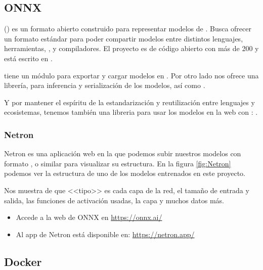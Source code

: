 \subsection{ONNX}\label{tool:ONNX}

 () es un formato abierto construido para representar modelos de . Busca ofrecer un formato estándar para poder compartir modelos entre distintos lenguajes, herramientas, ,  y compiladores. El proyecto es de código abierto con más de 200  y está escrito en .



 tiene un módulo para exportar y cargar modelos en . Por otro lado  nos ofrece una librería,  para inferencia y serialización de los modelos, así como .

Y por mantener el espíritu de la estandarización y reutilización entre lenguajes y ecosistemas, tenemos también una libreria para usar los modelos en la web con : .

\subsubsection{Netron}

Netron es una aplicación web en la que podemos subir nuestros modelos con formato ,  o similar para visualizar su estructura. En la figura \ref{fig:Netron} podemos ver la estructura de uno de los modelos entrenados en este proyecto.


Nos muestra de que <<tipo>> es cada capa de la red, el tamaño de entrada y salida, las funciones de activación usadas, la capa  y muchos datos más.

\begin{itemize}
  \item Accede a la web de ONNX en \url{https://onnx.ai/}
  \item Al app de Netron está disponible en: \url{https://netron.app/}
\end{itemize}

\subsection{Docker}

